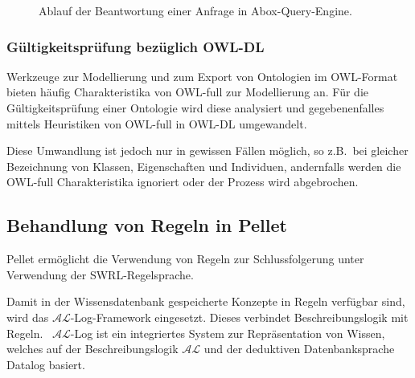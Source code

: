 \begin{figure}[htbp]
    \centering {}
    \caption{Ablauf der Beantwortung einer Anfrage in Abox-Query-Engine.\label{fig:pellet_queryengine_komponenten}\protect\footnotemark}
\end{figure}

\subsubsection{Gültigkeitsprüfung bezüglich OWL-DL}
\label{ssubsection:inferenz_pellet_owldl}
Werkzeuge zur Modellierung und zum Export von Ontologien im OWL-Format bieten häufig Charakteristika von OWL-full zur Modellierung an. Für die Gültigkeitsprüfung einer Ontologie wird diese analysiert und gegebenenfalles mittels Heuristiken von OWL-full in OWL-DL umgewandelt.

Diese Umwandlung ist jedoch nur in gewissen Fällen möglich, so z.B.\ bei gleicher Bezeichnung von Klassen, Eigenschaften und Individuen, andernfalls werden die OWL-full Charakteristika ignoriert oder der Prozess wird abgebrochen.

\subsection{Behandlung von Regeln in Pellet}
\label{subsection:inferenz_pellet_swrl}
Pellet ermöglicht die Verwendung von Regeln zur Schlussfolgerung unter Verwendung der SWRL-Regelsprache.

Damit in der Wissensdatenbank gespeicherte Konzepte in Regeln verfügbar sind, wird das $\mathcal{AL}$-Log-Framework eingesetzt. Dieses verbindet Beschreibungslogik mit Regeln.~\cite[S. 4,5]{sirin:pellet07} $\mathcal{AL}$-Log ist ein integriertes System zur Repräsentation von Wissen, welches auf der Beschreibungslogik $\mathcal{AL}$ und der deduktiven Datenbanksprache Datalog basiert.~\cite{allog}

